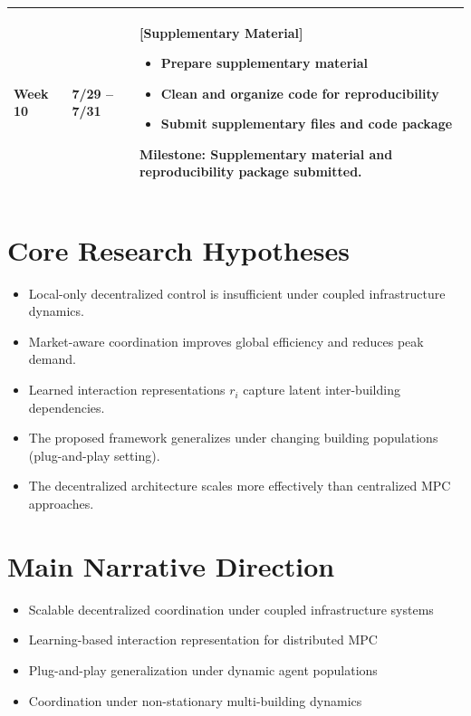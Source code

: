 \documentclass[11pt]{article}
\begin{document}
\begin{longtable}{p{1.8cm} p{2.3cm} p{10.5cm}}
\midrule

\textbf{Week 10} & 7/29 -- 7/31 &
\textbf{[Supplementary Material]}
\begin{itemize}[leftmargin=1.5em]
    \item Prepare supplementary material
    \item Clean and organize code for reproducibility
    \item Submit supplementary files and code package
\end{itemize}

\textbf{Milestone:}
Supplementary material and reproducibility package submitted.
\\

\bottomrule
\end{longtable}


\section*{Core Research Hypotheses}

\begin{itemize}[leftmargin=1.5em]

    \item Local-only decentralized control is insufficient under coupled infrastructure dynamics.

    \item Market-aware coordination improves global efficiency and reduces peak demand.

    \item Learned interaction representations $r_i$ capture latent inter-building dependencies.

    \item The proposed framework generalizes under changing building populations (plug-and-play setting).

    \item The decentralized architecture scales more effectively than centralized MPC approaches.

\end{itemize}


\section*{Main Narrative Direction}

\begin{itemize}[leftmargin=1.5em]

    \item Scalable decentralized coordination under coupled infrastructure systems

    \item Learning-based interaction representation for distributed MPC

    \item Plug-and-play generalization under dynamic agent populations

    \item Coordination under non-stationary multi-building dynamics

\end{itemize}
\end{document}
